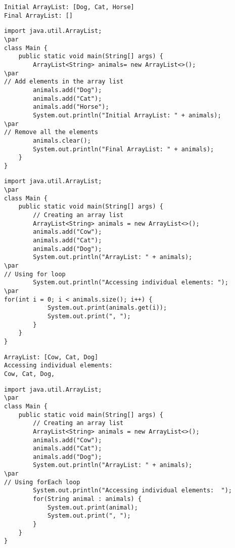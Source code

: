 \documentclass{book}
\def\lthtmlcheckvsize{\ifdim\ht\sizebox<\vsize 
  \ifdim\wd\sizebox<\hsize\expandafter\hfill\fi \expandafter\vfill
  \else\expandafter\vss\fi}%
\begin{document}
{\newpage\clearpage
{}%
\begin{lstlisting}
Initial ArrayList: [Dog, Cat, Horse]
Final ArrayList: []
\end{lstlisting}%
\lthtmlfigureZ
\lthtmlcheckvsize\clearpage}

{\newpage\clearpage
{}%
\begin{lstlisting}
import java.util.ArrayList;
\par
class Main {
    public static void main(String[] args) {
        ArrayList<String> animals= new ArrayList<>();
\par
// Add elements in the array list
        animals.add("Dog");
        animals.add("Cat");
        animals.add("Horse");
        System.out.println("Initial ArrayList: " + animals);
\par
// Remove all the elements
        animals.clear();
        System.out.println("Final ArrayList: " + animals);
    }
}
\end{lstlisting}%
\lthtmlfigureZ
\lthtmlcheckvsize\clearpage}

{\newpage\clearpage
{}%
\begin{lstlisting}
import java.util.ArrayList;
\par
class Main {
    public static void main(String[] args) {
        // Creating an array list
        ArrayList<String> animals = new ArrayList<>();
        animals.add("Cow");
        animals.add("Cat");
        animals.add("Dog");
        System.out.println("ArrayList: " + animals);
\par
// Using for loop
        System.out.println("Accessing individual elements: ");
\par
for(int i = 0; i < animals.size(); i++) {
            System.out.print(animals.get(i));
            System.out.print(", ");
        }
    }
}
\end{lstlisting}%
\lthtmlfigureZ
\lthtmlcheckvsize\clearpage}

{\newpage\clearpage
{}%
\begin{lstlisting}
ArrayList: [Cow, Cat, Dog]
Accessing individual elements:
Cow, Cat, Dog,
\end{lstlisting}%
\lthtmlfigureZ
\lthtmlcheckvsize\clearpage}

{\newpage\clearpage
{}%
\begin{lstlisting}
import java.util.ArrayList;
\par
class Main {
    public static void main(String[] args) {
        // Creating an array list
        ArrayList<String> animals = new ArrayList<>();
        animals.add("Cow");
        animals.add("Cat");
        animals.add("Dog");
        System.out.println("ArrayList: " + animals);
\par
// Using forEach loop
        System.out.println("Accessing individual elements:  ");
        for(String animal : animals) {
            System.out.print(animal);
            System.out.print(", ");
        }
    }
}
\end{lstlisting}%
\lthtmlfigureZ
\lthtmlcheckvsize\clearpage}
\end{document}

